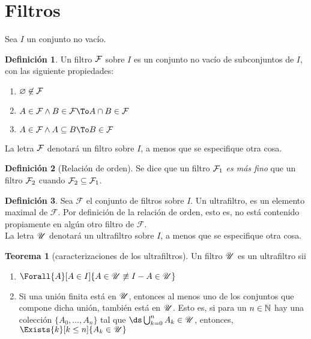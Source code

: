 \documentclass{article}
\theoremstyle{definition}
\newtheorem{definition}{Definición}[section]
\newtheorem{theorem}{Teorema}[section]
\begin{document}
\tableofcontents
\clearpage
\section{Filtros}

Sea $I$ un conjunto no vacío.
\begin{definition}
  Un filtro $\mathcal{F}$ sobre $I$ es un conjunto no
  vacío de subconjuntos de $I$, con las siguiente propiedades:
  \begin{enumerate}
    \item $\varnothing \not\in \mathcal{F}$
    \item $A \in \F \land B \in \F \To A\cap B \in \F$
    \item $A \in \F \land A \subseteq B \To B \in \F$
  \end{enumerate}
  La letra $\mathcal{F}$ denotará un filtro sobre $I$, a menos que se especifique
  otra cosa.
\end{definition}

\begin{definition}[Relación de orden] Se dice que
  un filtro $\mathcal{F}_1$ \emph{es más fino} que un filtro $\mathcal{F}_2$ cuando
  $\mathcal{F}_2 \subseteq \mathcal{F}_1$.
\end{definition}

\begin{definition}
  Sea $\mathcal{F}$ el conjunto de filtros sobre $I$. 
  Un ultrafiltro, es un elemento maximal de $\mathcal{F}$. Por definición
  de la relación de orden, esto es, no está contenido propiamente en algún
  otro filtro de $\mathcal{F}$.\\
  La letra $\mathscr{U}$ denotará un ultrafiltro sobre $I$, a menos que se especifique
  otra cosa.
\end{definition}

\begin{theorem}[caracterizaciones de los ultrafiltros]
  Un filtro $\mathscr{U}$ es un ultrafiltro sii
  \begin{enumerate}
    \item $\Forall{A}[A \in I]{A \in \U \not\equiv I - A \in \U}$
    \item Si una unión finita está en $\mathscr{U}$, entonces al menos uno de
          los conjuntos que compone dicha unión, también está en $\mathscr{U}$.
          Esto es, si para un $n\in\mathbb{N}$ hay una colección $\{A_0,\dots,A_n\}$
          tal que $\ds\bigcup_{k=0}^n A_k \in \U$, entonces,
          $\Exists{k}[k\leq n]{A_k \in \U}$
  \end{enumerate}
\end{theorem}
\end{document}
